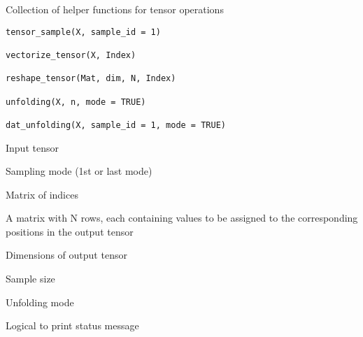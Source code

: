 \documentclass[a4paper]{book}
\begin{document}
%
\begin{Examples}
\end{Examples}
%
\begin{Description}
Collection of helper functions for tensor operations
\end{Description}
%
\begin{Usage}
\begin{verbatim}
tensor_sample(X, sample_id = 1)

vectorize_tensor(X, Index)

reshape_tensor(Mat, dim, N, Index)

unfolding(X, n, mode = TRUE)

dat_unfolding(X, sample_id = 1, mode = TRUE)
\end{verbatim}
\end{Usage}
%
\begin{Arguments}
\begin{ldescription}
\item[\code{X}] Input tensor

\item[\code{sample\_id}] Sampling mode (1st or last mode)

\item[\code{Index}] Matrix of indices

\item[\code{Mat}] A matrix with N rows, each containing values to be assigned to the corresponding positions in the output tensor

\item[\code{dim}] Dimensions of output tensor

\item[\code{N}] Sample size

\item[\code{n}] Unfolding mode

\item[\code{mode}] Logical to print status message
\end{ldescription}
\end{Arguments}
\end{document}
